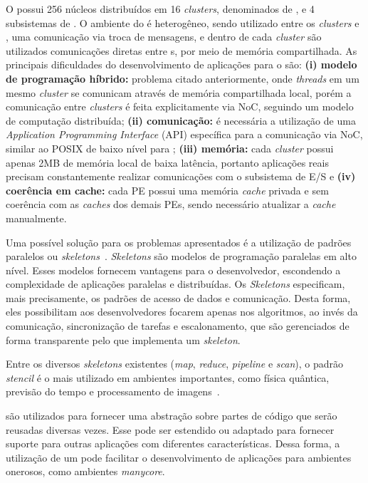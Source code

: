 O \mppa possui 256 núcleos distribuídos em 16 \textit{clusters}, denominados de
\pe, e 4 subsistemas de \io. O ambiente do \mppa é heterogêneo, sendo utilizado
entre os \textit{clusters} e \io, uma comunicação via troca de mensagens, e
dentro de cada \textit{cluster} são utilizados comunicações diretas entre
\pe{}s, por meio de memória compartilhada. As principais dificuldades do
desenvolvimento de aplicações para o \mppa são: \textbf{(i) modelo de
    programação híbrido:} problema citado anteriormente, onde \textit{threads}
em um mesmo \textit{cluster} se comunicam através de memória compartilhada
local, porém a comunicação entre \textit{clusters} é feita explicitamente via
NoC, seguindo um modelo de computação distribuída; \textbf{(ii) comunicação:} é
necessária a utilização de uma \textit{Application Programming Interface} (API)
específica para a comunicação via NoC, similar ao POSIX de baixo nível para
\ipc; \textbf{(iii) memória:} cada \textit{cluster} possui apenas 2MB de memória
local de baixa latência, portanto aplicações reais precisam constantemente
realizar comunicações com o subsistema de E/S e \textbf{(iv) coerência em
    cache:} cada PE possui uma memória \textit{cache} privada e sem coerência
com as \textit{caches} dos demais PEs, sendo necessário atualizar a
\textit{cache} manualmente.

Uma possível solução para os problemas apresentados é a utilização de padrões
paralelos ou \textit{skeletons}~\cite{cole-skeleton:2004}. \textit{Skeletons}
são modelos de programação paralelas em alto nível. Esses modelos fornecem
vantagens para o desenvolvedor, escondendo a complexidade de aplicações
paralelas e distribuídas. Os \textit{Skeletons} especificam, mais precisamente,
os padrões de acesso de dados e comunicação. Desta forma, eles possibilitam aos
desenvolvedores focarem apenas nos algoritmos, ao invés da comunicação,
sincronização de tarefas e escalonamento, que são gerenciados de forma
transparente pelo \fw que implementa um \textit{skeleton}.

Entre os diversos \textit{skeletons} existentes (\textit{map}, \textit{reduce},
\textit{pipeline} e \textit{scan}), o padrão \textit{stencil} é o mais
utilizado em ambientes importantes, como física quântica, previsão do tempo e
processamento de imagens~\cite{gonzalez06,holewinski12}.


\Fws são utilizados para fornecer uma abstração sobre partes de código que serão
reusadas diversas vezes. Esse \fw pode ser estendido ou adaptado para fornecer
suporte para outras aplicações com diferentes características. Dessa forma, a
utilização de um \fw pode facilitar o desenvolvimento de aplicações para
ambientes onerosos, como ambientes \textit{manycore}.


